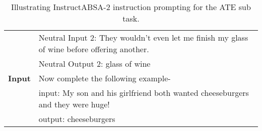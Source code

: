 \documentclass[11pt]{article}
\newcommand{\name}{\textsc{I}nstruct\textsc{ABSA}\xspace}
\begin{document}
\begin{table*}[]
\begin{tabular}{ll}
\textbf{}                 & Neutral Input 2: They wouldn't even let me finish my glass of wine before offering another.  \\
\textbf{}                 & Neutral Output 2: glass of wine                                                             \\ \hline
\textbf{Input}            & Now complete the following example-                                               \\
\textbf{}                 & input: My son and his girlfriend both wanted cheeseburgers and they were huge!    \\
                          & output: cheeseburgers                                                              \\ \hline
\end{tabular}
\caption{Illustrating \name{}-2 instruction prompting for the ATE sub task.}
\label{tab:ate_ip}
\end{table*} 
\end{document}

